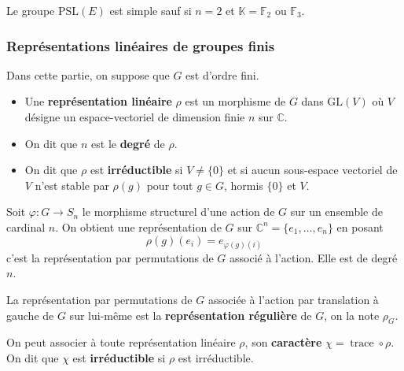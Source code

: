   \begin{theorem}
    Le groupe $\mathrm{PSL}(E)$ est simple sauf si $n = 2$ et $\mathbb{K} = \mathbb{F}_2$ ou $\mathbb{F}_3$.
  \end{theorem}

  \subsubsection{Représentations linéaires de groupes finis}


  Dans cette partie, on suppose que $G$ est d'ordre fini.

  \begin{definition}
    \begin{itemize}
      \item Une \textbf{représentation linéaire} $\rho$ est un morphisme de $G$ dans $\mathrm{GL}(V)$ où $V$ désigne un espace-vectoriel de dimension finie $n$ sur $\mathbb{C}$.
      \item On dit que $n$ est le \textbf{degré} de $\rho$.
      \item On dit que $\rho$ est \textbf{irréductible} si $V \neq \{ 0 \}$ et si aucun sous-espace vectoriel de $V$ n'est stable par $\rho(g)$ pour tout $g \in G$, hormis $\{ 0 \}$ et $V$.
    \end{itemize}
  \end{definition}

  \begin{example}
    Soit $\varphi : G \rightarrow S_n$ le morphisme structurel d'une action de $G$ sur un ensemble de cardinal $n$. On obtient une représentation de $G$ sur $\mathbb{C}^n = \{ e_1, \dots, e_n \}$ en posant
    \[ \rho(g)(e_i) = e_{\varphi(g)(i)} \]
    c'est la représentation par permutations de $G$ associé à l'action. Elle est de degré $n$.
  \end{example}

  \begin{definition}
    La représentation par permutations de $G$ associée à l'action par translation à gauche de $G$ sur lui-même est la \textbf{représentation régulière} de $G$, on la note $\rho_G$.
  \end{definition}


  \begin{definition}
    On peut associer à toute représentation linéaire $\rho$, son \textbf{caractère} $\chi = \operatorname{trace} \circ \rho$. On dit que $\chi$ est \textbf{irréductible} si $\rho$ est irréductible.
  \end{definition}

